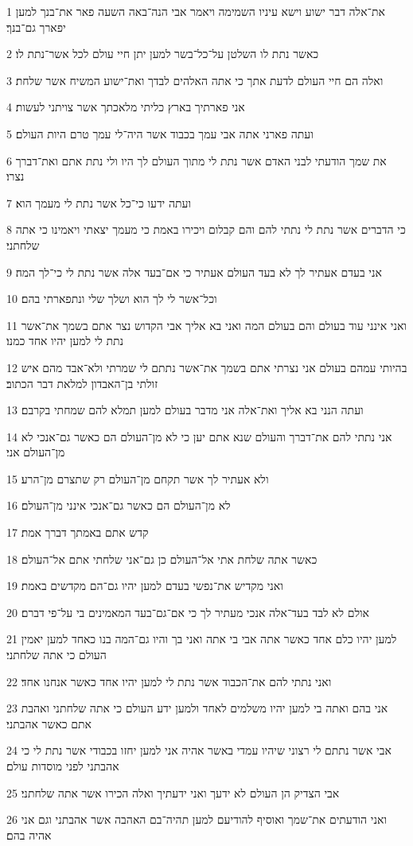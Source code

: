 \par 1 את־אלה דבר ישוע וישא עיניו השמימה ויאמר אבי הנה־באה השעה פאר את־בנך למען יפארך גם־בנך׃
\par 2 כאשר נתת לו השלטן על־כל־בשר למען יתן חיי עולם לכל אשר־נתת לו׃
\par 3 ואלה הם חיי העולם לדעת אתך כי אתה האלהים לבדך ואת־ישוע המשיח אשר שלחת׃
\par 4 אני פארתיך בארץ כליתי מלאכתך אשר צויתני לעשות׃
\par 5 ועתה פארני אתה אבי עמך בכבוד אשר היה־לי עמך טרם היות העולם׃
\par 6 את שמך הודעתי לבני האדם אשר נתת לי מתוך העולם לך היו ולי נתת אתם ואת־דברך נצרו׃
\par 7 ועתה ידעו כי־כל אשר נתת לי מעמך הוא׃
\par 8 כי הדברים אשר נתת לי נתתי להם והם קבלום ויכירו באמת כי מעמך יצאתי ויאמינו כי אתה שלחתני׃
\par 9 אני בעדם אעתיר לך לא בעד העולם אעתיר כי אם־בעד אלה אשר נתת לי כי־לך המה׃
\par 10 וכל־אשר לי לך הוא ושלך שלי ונתפארתי בהם׃
\par 11 ואני אינני עוד בעולם והם בעולם המה ואני בא אליך אבי הקדוש נצר אתם בשמך את־אשר נתת לי למען יהיו אחד כמנו׃
\par 12 בהיותי עמהם בעולם אני נצרתי אתם בשמך את־אשר נתתם לי שמרתי ולא־אבד מהם איש זולתי בן־האבדון למלאת דבר הכתוב׃
\par 13 ועתה הנני בא אליך ואת־אלה אני מדבר בעולם למען תמלא להם שמחתי בקרבם׃
\par 14 אני נתתי להם את־דברך והעולם שנא אתם יען כי לא מן־העולם הם כאשר גם־אנכי לא מן־העולם אני׃
\par 15 ולא אעתיר לך אשר תקחם מן־העולם רק שתצרם מן־הרע׃
\par 16 לא מן־העולם הם כאשר גם־אנכי אינני מן־העולם׃
\par 17 קדש אתם באמתך דברך אמת׃
\par 18 כאשר אתה שלחת אתי אל־העולם כן גם־אני שלחתי אתם אל־העולם׃
\par 19 ואני מקדיש את־נפשי בעדם למען יהיו גם־הם מקדשים באמת׃
\par 20 אולם לא לבד בעד־אלה אנכי מעתיר לך כי אם־גם־בעד המאמינים בי על־פי דברם׃
\par 21 למען יהיו כלם אחד כאשר אתה אבי בי אתה ואני בך והיו גם־המה בנו כאחד למען יאמין העולם כי אתה שלחתני׃
\par 22 ואני נתתי להם את־הכבוד אשר נתת לי למען יהיו אחד כאשר אנחנו אחד׃
\par 23 אני בהם ואתה בי למען יהיו משלמים לאחד ולמען ידע העולם כי אתה שלחתני ואהבת אתם כאשר אהבתני׃
\par 24 אבי אשר נתתם לי רצוני שיהיו עמדי באשר אהיה אני למען יחזו בכבודי אשר נתת לי כי אהבתני לפני מוסדות עולם׃
\par 25 אבי הצדיק הן העולם לא ידעך ואני ידעתיך ואלה הכירו אשר אתה שלחתני׃
\par 26 ואני הודעתים את־שמך ואוסיף להודיעם למען תהיה־בם האהבה אשר אהבתני וגם אני אהיה בהם׃

